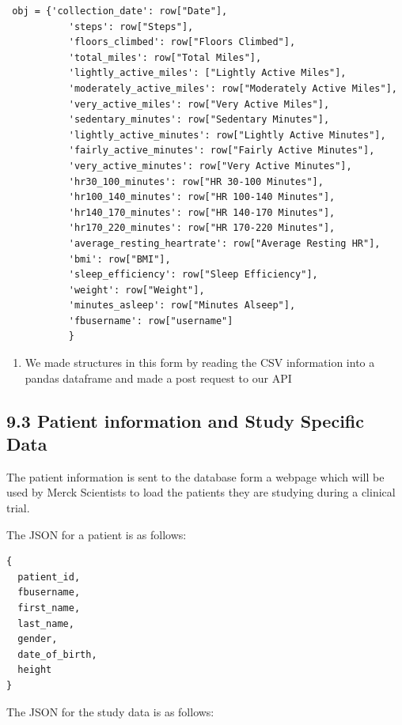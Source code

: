 \documentclass[]{book}
\providecommand{\tightlist}{%
  \setlength{\itemsep}{0pt}\setlength{\parskip}{0pt}}
\begin{document}
\begin{verbatim}
 obj = {'collection_date': row["Date"],
           'steps': row["Steps"],
           'floors_climbed': row["Floors Climbed"],
           'total_miles': row["Total Miles"],
           'lightly_active_miles': ["Lightly Active Miles"],
           'moderately_active_miles': row["Moderately Active Miles"],
           'very_active_miles': row["Very Active Miles"],
           'sedentary_minutes': row["Sedentary Minutes"],
           'lightly_active_minutes': row["Lightly Active Minutes"],
           'fairly_active_minutes': row["Fairly Active Minutes"],
           'very_active_minutes': row["Very Active Minutes"],
           'hr30_100_minutes': row["HR 30-100 Minutes"],
           'hr100_140_minutes': row["HR 100-140 Minutes"],
           'hr140_170_minutes': row["HR 140-170 Minutes"],
           'hr170_220_minutes': row["HR 170-220 Minutes"],
           'average_resting_heartrate': row["Average Resting HR"],
           'bmi': row["BMI"],
           'sleep_efficiency': row["Sleep Efficiency"],
           'weight': row["Weight"],
           'minutes_asleep': row["Minutes Alseep"],
           'fbusername': row["username"]
           }
\end{verbatim}

\begin{enumerate}
\def\labelenumi{\arabic{enumi}.}
\setcounter{enumi}{1}
\tightlist
\item
  We made structures in this form by reading the CSV information into a pandas dataframe and made a post request to our API
\end{enumerate}

\hypertarget{patient-information-and-study-specific-data}{%
\subsection{9.3 Patient information and Study Specific Data}\label{patient-information-and-study-specific-data}}

The patient information is sent to the database form a webpage which will be used by Merck Scientists to load the patients they are studying during a clinical trial.

The JSON for a patient is as follows:

\begin{verbatim}
{
  patient_id,
  fbusername,
  first_name,
  last_name,
  gender,
  date_of_birth,
  height
}
\end{verbatim}

The JSON for the study data is as follows:
\end{document}
